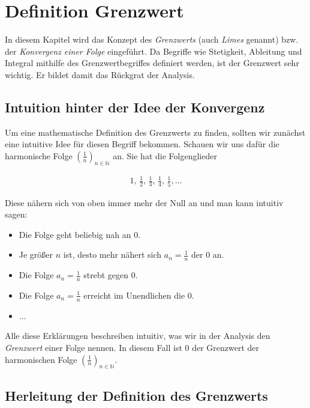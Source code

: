 \documentclass[fontsize=9pt,
               parskip=half-,
               DIV=14,
               listof=chapterentry,
               tocflat]{scrbook}
\begin{document}
\chapter{Definition Grenzwert}

In diesem Kapitel wird das Konzept des \emph{Grenzwerts} (auch \emph{Limes} genannt) bzw. der \emph{Konvergenz einer Folge} eingeführt. Da Begriffe wie Stetigkeit, Ableitung und Integral mithilfe des Grenzwertbegriffes definiert werden, ist der Grenzwert sehr wichtig. Er bildet damit das Rückgrat der Analysis.

\section{Intuition hinter der Idee der Konvergenz}

Um eine mathematische Definition des Grenzwerts zu finden, sollten wir zunächst eine intuitive Idee für diesen Begriff bekommen. Schauen wir uns dafür die harmonische Folge $\left({\tfrac {1}{n}}\right)_{n\in \mathbb {N} }$ an. Sie hat die Folgenglieder

\begin{align*}
1,\,{\tfrac {1}{2}},\,{\tfrac {1}{3}},\,{\tfrac {1}{4}},\,{\tfrac {1}{5}},\ldots 
\end{align*}

Diese nähern sich von oben immer mehr der Null an und man kann intuitiv sagen:

\begin{itemize}
\item Die Folge geht beliebig nah an $0$.
\item Je größer $n$ ist, desto mehr nähert sich $a_{n}={\tfrac {1}{n}}$ der $0$ an.
\item Die Folge $a_{n}={\tfrac {1}{n}}$ strebt gegen $0$.
\item Die Folge $a_{n}={\tfrac {1}{n}}$ erreicht im Unendlichen die $0$.
\item ...
\end{itemize}

Alle diese Erklärungen beschreiben intuitiv, was wir in der Analysis den \emph{Grenzwert} einer Folge nennen. In diesem Fall ist $0$ der Grenzwert der harmonischen Folge $\left({\tfrac {1}{n}}\right)_{n\in \mathbb {N} }$.

\section{Herleitung der Definition des Grenzwerts}
\end{document}
